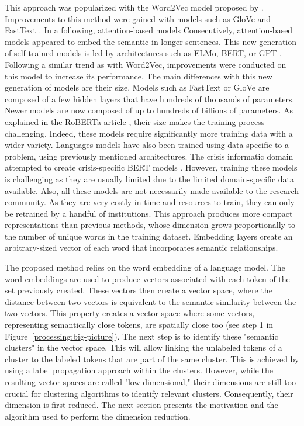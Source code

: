 This approach was popularized with the Word2Vec model proposed by \textcite{mikolovDistributedRepresentationsWords2013}.
Improvements to this method were gained with models such as GloVe and FastText \parencite{bojanowskiEnrichingWordVectors2016,penningtonGloveGlobalVectors2014}.
In a following, attention-based models
Consecutively, attention-based models appeared to embed the semantic in longer sentences.
This new generation of self-trained models is led by architectures such as ELMo, BERT, or GPT \parencite{devlinBERTPretrainingDeep2018,petersDeepContextualizedWord2018}.
Following a similar trend as with Word2Vec, improvements were conducted on this model to increase its performance.
The main differences with this new generation of models are their size.
Models such as FastText or GloVe are composed of a few hidden layers that have hundreds of thousands of parameters.
Newer models are now composed of up to hundreds of billions of parameters.
As explained in the RoBERTa article \parencite{liuRoBERTaRobustlyOptimized2019}, their size makes the training process challenging.
Indeed, these models require significantly more training data with a wider variety.
Languages models have also been trained using data specific to a problem, using previously mentioned architectures.
The crisis informatic domain attempted to create crisis-specific BERT models \parencite{liuCrisisBERTRobustTransformer2021}.
However, training these models is challenging as they are usually limited due to the limited domain-specific data available.
Also, all these models are not necessarily made available to the research community.
As they are very costly in time and resources to train, they can only be retrained by a handful of institutions.
This approach produces more compact representations than previous methods, whose dimension grows proportionally to the number of unique words in the training dataset.
Embedding layers create an arbitrary-sized vector of each word that incorporates semantic relationships.

The proposed method relies on the word embedding of a language model.
The word embeddings are used to produce vectors associated with each token of the set previously created.
These vectors then create a vector space, where the distance between two vectors is equivalent to the semantic similarity between the two vectors.
This property creates a vector space where some vectors, representing semantically close tokens, are spatially close too (see step 1 in Figure~\ref{processing:big-picture}).
The next step is to identify these "semantic clusters" in the vector space.
This will allow linking the unlabeled tokens of a cluster to the labeled tokens that are part of the same cluster.
This is achieved by using a label propagation approach within the clusters.
However, while the resulting vector spaces are called "low-dimensional," their dimensions are still too crucial for clustering algorithms to identify relevant clusters.
Consequently, their dimension is first reduced.
The next section presents the motivation and the algorithm used to perform the dimension reduction.

